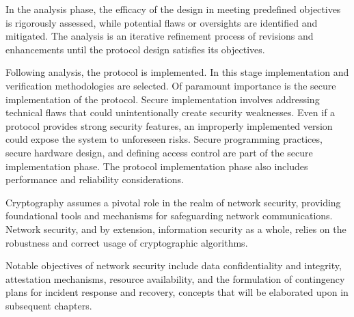 In the analysis phase, the efficacy of the design in meeting predefined objectives is rigorously assessed, while potential flaws or oversights are identified and mitigated. The analysis is an iterative refinement process of revisions and enhancements until the protocol design satisfies its objectives.

Following analysis, the protocol is implemented. In this stage implementation and verification methodologies are selected. Of paramount importance is the secure implementation of the protocol. 
Secure implementation involves addressing technical flaws that could unintentionally create security weaknesses. Even if a protocol provides strong security features, an improperly implemented version could expose the system to unforeseen risks. Secure programming practices, secure hardware design, and defining access control are part of the secure implementation phase. The protocol implementation phase also includes performance and reliability considerations.

Cryptography assumes a pivotal role in the realm of network security, providing foundational tools and mechanisms for safeguarding network communications. Network security, and by extension, information security as a whole, relies on the robustness and correct usage of cryptographic algorithms.

Notable objectives of network security include data confidentiality and integrity, attestation mechanisms, resource availability, and the formulation of contingency plans for incident response and recovery, concepts that will be elaborated upon in subsequent chapters.